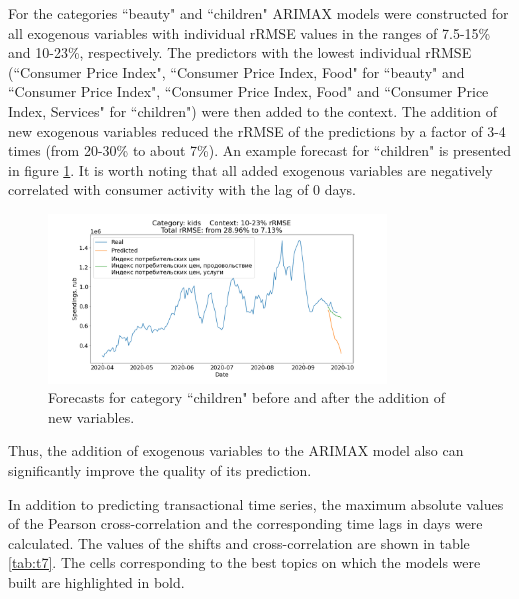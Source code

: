 \documentclass[13pt, a4paper]{article}
\begin{document}
For the categories ``beauty" and ``children" ARIMAX models were constructed for all exogenous variables with individual rRMSE values in the ranges of 7.5-15\% and 10-23\%, respectively. The predictors with the lowest individual rRMSE (``Consumer Price Index", ``Consumer Price Index, Food" for ``beauty" and ``Consumer Price Index", ``Consumer Price Index, Food" and ``Consumer Price Index, Services" for ``children") were then added to the context. The addition of new exogenous variables reduced the rRMSE of the predictions by a factor of 3-4 times (from 20-30\% to about 7\%). An example forecast for ``children" is presented in figure \ref{fig:gr13}. It is worth noting that all added exogenous variables are negatively correlated with consumer activity with the lag of 0 days.
\begin{figure}[h!]\vspace*{4pt}
\centerline{\includegraphics[width=0.8\textwidth]{./visuals/gr13.png}}
\caption{Forecasts for category ``children" before and after the addition of new variables.}
\label{fig:gr13}
\end{figure}

Thus, the addition of exogenous variables to the ARIMAX model also can significantly improve the quality of its prediction. 

In addition to predicting transactional time series, the maximum absolute values of the Pearson cross-correlation and the corresponding time lags in days were calculated. The values of the shifts and cross-correlation are shown in table \ref{tab:t7}. The cells corresponding to the best topics on which the models were built are highlighted in bold.
\end{document}
